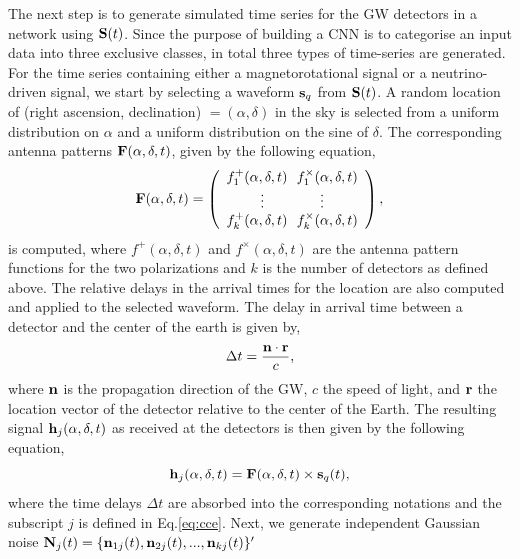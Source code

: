 \documentclass[aps,twocolumn,showpacs,groupedaddress, nofootinbib]{revtex4}  %
\begin{document}
The next step is to generate simulated time series for the \ac{GW} detectors in a network using $\bold{S}(t)$.
Since the purpose of building a \ac{CNN} is to categorise an input data into three exclusive classes,
in total three types of time-series are generated.
For the time series containing either a magnetorotational signal or a neutrino-driven signal, 
we start by selecting a waveform $\bold{s}_q$ from $\bold{S}(t)$.
A random location of (right ascension, declination) $=(\alpha, \delta)$ in the sky is selected from a uniform distribution on $\alpha$ and a uniform distribution on the sine of $\delta$.
The corresponding antenna patterns $\bold{F}(\alpha, \delta, t)$, given by the following equation,
\begin{equation}\label{eq:ap}
\bold{F}(\alpha, \delta, t)= \left(\begin{array}{cc}
f_1^+(\alpha, \delta, t)~~f_1^\times(\alpha, \delta, t) \\
\vdots~~~~~~~~~~~~\vdots \\
f_k^+(\alpha, \delta, t)~~f_k^\times(\alpha, \delta, t) \\
\end{array}\right),
\end{equation}
is computed, 
where $f^+(\alpha, \delta, t)$ and $f^{\times}(\alpha, \delta, t)$ are the antenna pattern functions for the two polarizations and $k$ is the number of detectors as defined above.
The relative delays in the arrival times for the location are also computed and applied to the selected waveform.
The delay in arrival time between a detector and the center of the earth is given by,
\begin{equation}\label{eq:tdetector}
%
\Delta t = \frac{\bold{n} \cdot \bold{r}}{c},
%
\end{equation}
%
where $\bold{n}$ is the propagation direction of the \ac{GW}, $c$ the speed of light, and $\bold{r}$ the location vector of the detector
relative to the center of the Earth. 
The resulting signal $ \bold{h}_j(\alpha, \delta, t)$ as received at the detectors is then given by the following equation,
\begin{equation}\label{eq:ht2}
 \bold{h}_j(\alpha, \delta, t) = \bold{F}(\alpha, \delta, t) \times \bold{s}_q(t),
\end{equation}
where the time delays $\Delta t$ are absorbed into the corresponding notations and the subscript $j$ is defined in Eq.\ref{eq:cce}.
Next, we generate independent Gaussian noise $\bold{N}_j(t) = \{\bold{n}_{1j}(t), \bold{n}_{2j}(t), ..., \bold{n}_{kj}(t)\}'$ 
\end{document}
